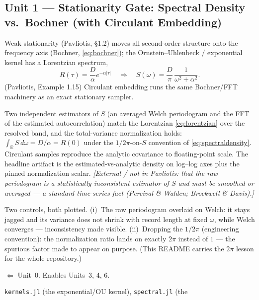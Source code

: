 \documentclass[11pt]{article}
\newcommand{\extnote}[1]{{\small\color{extgray}\emph{[External / not in Pavliotis: #1]}}}
\newcommand{\pav}[1]{{\small\color{hubblue}(Pavliotis, #1)}}
\newenvironment{brief}{%
  \begin{description}[style=sameline,leftmargin=2.3cm,font=\bfseries\color{hubblue}]
}{%
  \end{description}
}
\begin{document}
\subsection*{Unit 1 --- Stationarity Gate: Spectral Density vs.\ Bochner (with Circulant Embedding)}
\begin{brief}
\item[Idea] Weak stationarity \pav{\S1.2} moves all second-order structure onto the frequency axis
(Bochner, \eqref{eq:bochner}); the Ornstein--Uhlenbeck / exponential kernel has a Lorentzian
spectrum,
\begin{equation}
R(\tau) = \frac{D}{\alpha}e^{-\alpha|\tau|} \quad\Longrightarrow\quad
S(\omega) = \frac{D}{\pi}\,\frac{1}{\omega^2+\alpha^2}.
\label{eq:lorentzian}
\end{equation}
\pav{Example 1.15} Circulant embedding runs the same Bochner/FFT machinery as an exact stationary
sampler.
\item[Proves] Two independent estimators of $S$ (an averaged Welch periodogram and the FFT of the
estimated autocorrelation) match the Lorentzian \eqref{eq:lorentzian} over the resolved band, and the
total-variance normalization holds: $\int_{\mathbb{R}}S\,d\omega = D/\alpha = R(0)$ under the
$1/2\pi$-on-$S$ convention of \eqref{eq:spectraldensity}. Circulant samples reproduce the analytic
covariance to floating-point scale. The headline artifact is the estimated-vs-analytic density on
log--log axes plus the pinned normalization scalar. \extnote{that the raw periodogram is a
statistically \emph{inconsistent} estimator of $S$ and must be smoothed or averaged --- a standard
time-series fact (Percival \& Walden; Brockwell \& Davis).}
\item[Falsifier] Two controls, both plotted. (i)~The raw periodogram overlaid on Welch: it stays
jagged and its variance does not shrink with record length at fixed $\omega$, while Welch converges
--- inconsistency made visible. (ii)~Dropping the $1/2\pi$ (engineering convention): the normalization
ratio lands on exactly $2\pi$ instead of $1$ --- the spurious factor made to appear on purpose. (This
README carries the $2\pi$ lesson for the whole repository.)
\item[Depends on / enables] $\Leftarrow$ Unit~0. Enables Units~3, 4, 6.
\item[Deliverable shape] \texttt{kernels.jl} (the exponential/OU kernel), \texttt{spectral.jl} (the

\end{brief}
\end{document}
